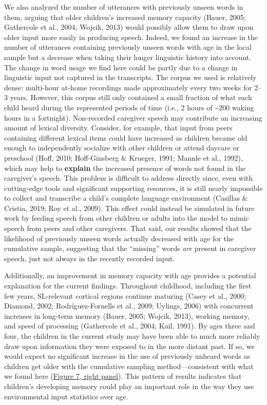 \documentclass[
  english,
  man,mask,floatsintext]{apa6}
\begin{document}
We also analyzed the number of utterances with previously unseen words in them, arguing that older children's increased memory capacity (Bauer, 2005; Gathercole et al., 2004; Wojcik, 2013) would possibly allow them to draw upon older input more easily in producing speech. Indeed, we found an increase in the number of utterances containing previously unseen words with age in the local sample but a decrease when taking their longer linguistic history into account. The change in word usage we find here could be partly due to a change in linguistic input not captured in the transcripts. The corpus we used is relatively dense: multi-hour at-home recordings made approximately every two weeks for 2--3 years. However, this corpus still only contained a small fraction of what each child heard during the represented periods of time (i.e., 2 hours of \textasciitilde200 waking hours in a fortnight). Non-recorded caregiver speech may contribute an increasing amount of lexical diversity. Consider, for example, that input from peers containing different lexical items could have increased as children became old enough to independently socialize with other children or attend daycare or preschool (Hoff, 2010; Hoff-Ginsberg \& Krueger, 1991; Mannle et al., 1992), which may help to \textbf{explain} the increased presence of words not found in the caregiver's speech. This problem is difficult to address directly since, even with cutting-edge tools and significant supporting resources, it is still nearly impossible to collect and transcribe a child's complete language environment (Casillas \& Cristia, 2019; Roy et al., 2009). This effect could instead be simulated in future work by feeding speech from other children or adults into the model to mimic speech from peers and other caregivers. That said, our results showed that the likelihood of previously unseen words actually decreased with age for the cumulative sample, suggesting that the \enquote{missing} words \emph{are} present in caregiver speech, just not always in the recently recorded input.

Additionally, an improvement in memory capacity with age provides a potential explanation for the current findings. Throughout childhood, including the first few years, SL-relevant cortical regions continue maturing (Casey et al., 2000; Diamond, 2002; Rodríguez-Fornells et al., 2009; Uylings, 2006) with concurrent increases in long-term memory (Bauer, 2005; Wojcik, 2013), working memory, and speed of processing (Gathercole et al., 2004; Kail, 1991). By ages three and four, the children in the current study may have been able to much more reliably draw upon information they were exposed to in the more distant past. If so, we would expect no significant increase in the use of previously unheard words as children get older with the cumulative sampling method---consistent with what we found here (\protect\hyperlink{fig7}{Figure 7, right panel}). This pattern of results indicates that children's developing memory could play an important role in the way they use environmental input statistics over age.
\end{document}

